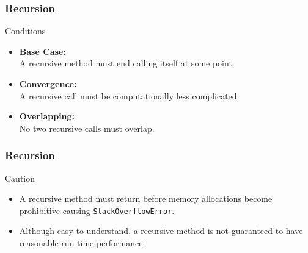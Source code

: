 \documentclass[10pt, compress]{beamer}
\begin{document}
\begin{frame}[fragile]
\frametitle{Recursion}
	\begin{block}{Conditions}
		\begin{itemize}
			\item[] \textbf{Base Case:}\\A recursive method must end calling itself at some point.
			\item[] \textbf{Convergence:}\\A recursive call must be computationally less complicated.
			\item[] \textbf{Overlapping:}\\No two recursive calls must overlap.
		\end{itemize}
	\end{block}
\end{frame}

\begin{frame}[fragile]
\frametitle{Recursion}
	\begin{block}{Caution}
		\begin{itemize}
			\item[] A recursive method must return before memory allocations become prohibitive causing \texttt{\small StackOverflowError}.
			\item[] Although easy to understand, a recursive method is not guaranteed to have reasonable run-time performance.
		\end{itemize}
	\end{block}
\end{frame}

\end{document}
